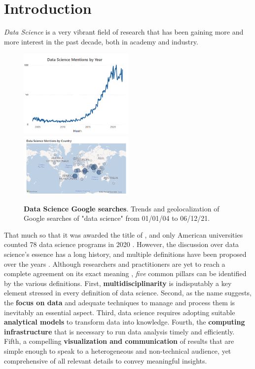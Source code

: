 \chapter{Introduction}
\label{chap:introduction}


\emph{Data Science} is a very vibrant field of research that has been gaining more and more interest in the past decade, both in academy and industry. 
\begin{figure}
\centerline{
\includegraphics[width=0.5\textwidth]{figures/DataScience/trend_ds.png}
\includegraphics[width=0.5\textwidth]{figures/DataScience/map_ds.png}
}
\caption{
\textbf{Data Science Google searches}. Trends and geolocalization of Google searches of "data science" from 01/01/04 to 06/12/21.
} 
\label{fig:GoogleTrendsDS}
\end{figure}
That much so that it was awarded the title of  \cite{davenport2012sexiest}, and only American universities counted 78 data science programs in 2020 \cite{zhang2021data}.
However, the discussion over data science's essence has a long history, and multiple definitions have been proposed over the years \cite{donoho201750years}.
Although researchers and practitioners are yet to reach a complete agreement on its exact meaning  \cite{ASA2015statement}, \emph{five} common pillars can be identified by the various definitions.
First, \textbf{multidisciplinarity} is indisputably a key element stressed in every definition of data science. 
Second, as the name suggests, the \textbf{focus on data} and adequate techniques to manage and process them is inevitably an essential aspect.
Third, data science requires adopting suitable \textbf{analytical models} to transform data into knowledge.
Fourth, the \textbf{computing infrastructure} that is necessary to run data analysis timely and efficiently. 
Fifth, a compelling \textbf{visualization and communication} of results that are simple enough to speak to a heterogeneous and non-technical audience, yet comprehensive of all relevant details to convey meaningful insights.

